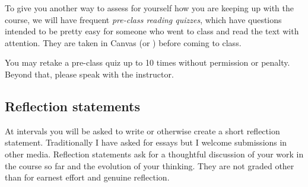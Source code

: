 \documentclass[symmetric]{tufte-handout}
\begin{document}
    To give you another way to assess for yourself how you are keeping up with
    the course, we will have frequent \emph{pre-class reading quizzes}, which
    have questions intended to be pretty easy for someone who went to class
    and read the text with attention. They are taken in Canvas (or \webwork{})
    before coming to class.

    You may retake a pre-class quiz
    up to 10 times
    without permission or penalty. Beyond that, please speak with
    the instructor.

\subsection{Reflection statements}

    At intervals you will be asked to write or otherwise create a short reflection
    statement. Traditionally I have asked for essays but I welcome submissions
    in other media. Reflection statements ask for a thoughtful discussion of your
    work in the course so far and the evolution of your thinking. They are not
    graded other than for earnest effort and genuine reflection.


\end{document}
